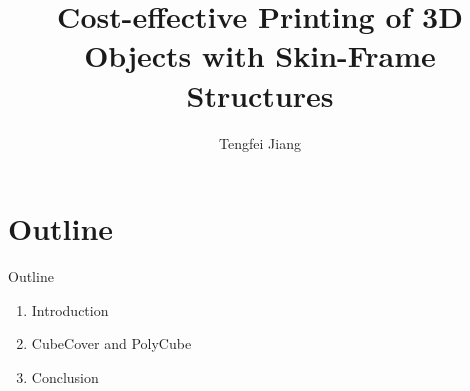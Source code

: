 \documentclass{beamer}
\begin{document}
\title{Cost-effective Printing of 3D Objects with Skin-Frame Structures}
\author{Tengfei Jiang}

\newcommand{\FPP}[2]{\frac{\partial #1}{\partial #2}}
\begin{frame}
  \titlepage
\end{frame}

\section{Outline}
\begin{frame}{Outline}
  \begin{enumerate}
    \item Introduction
    \item CubeCover and PolyCube
    \item Conclusion
  \end{enumerate}
\end{frame}
\end{document}
